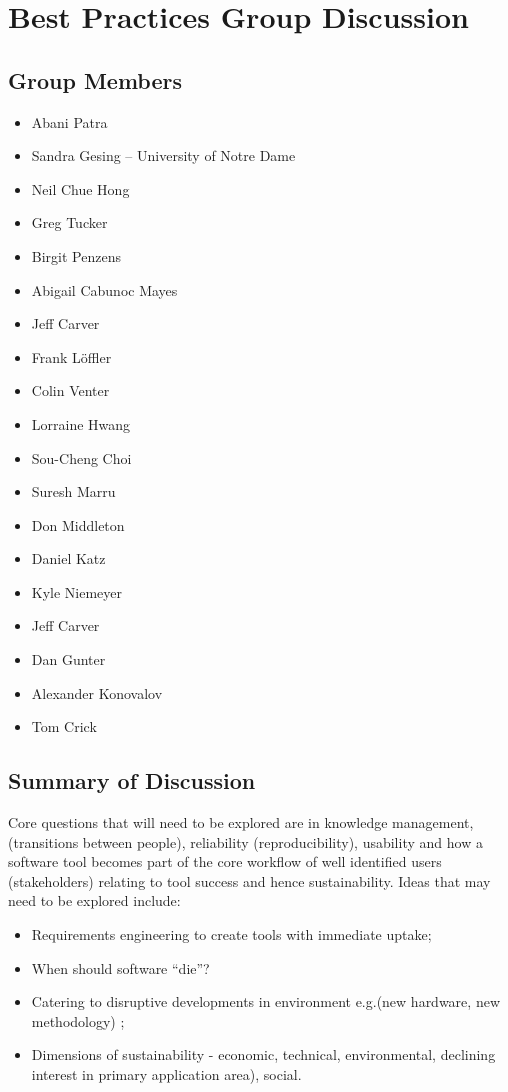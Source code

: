 \section{Best Practices Group Discussion}
\label{sec:appendix_best_practices}


\subsection{Group Members}

\begin{itemize}
\item Abani Patra 
\item Sandra Gesing -- University of Notre Dame
\item Neil Chue Hong 
\item Greg Tucker 
\item Birgit Penzens 
\item Abigail Cabunoc Mayes 
\item Jeff Carver 
\item Frank L\"{o}ffler 
\item Colin Venter 
\item Lorraine Hwang 
\item Sou-Cheng Choi
\item Suresh Marru 
\item Don Middleton 
\item Daniel Katz  
\item Kyle Niemeyer 
\item Jeff Carver 
\item Dan Gunter 
\item Alexander Konovalov 
\item Tom Crick 

\end{itemize}

\subsection{Summary of Discussion}
Core questions that will need to be explored are in knowledge management, 
(transitions between people), reliability (reproducibility), usability and how a software tool becomes part of the core workflow of well identified users (stakeholders)
relating to tool success and hence sustainability. Ideas 
that may need to be explored include:
\begin{itemize}
\item Requirements engineering to create tools with immediate uptake;
\item When should software ``die''?
\item Catering to disruptive developments in environment e.g.(new hardware, new methodology) ;
\item Dimensions of sustainability - economic, technical, environmental, 
declining interest in primary application area), social.
\end{itemize}

